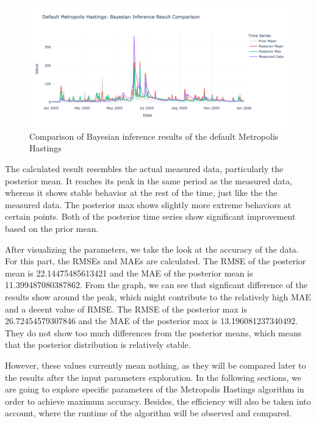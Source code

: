 \begin{figure}
    \centering
    \includegraphics[width=1\textwidth]{figures/basic_mh/default_mh/default_mh_bayes.png}
    \captionsetup{width=.8\textwidth}
    \caption{Comparison of Bayesian inference results of the default Metropolis Hastings}
    \label{fig:enter-label}
\end{figure}

The calculated result resembles the actual measured data, particularly the posterior mean. It reaches its peak in the same period as the measured data, whereas it shows stable behavior at the rest of the time, just like the the measured data. The posterior max shows slightly more extreme behaviors at certain points. Both of the posterior time series show significant improvement based on the prior mean. 

After visualizing the parameters, we take the look at the accuracy of the data. For this part, the RMSEs and MAEs are calculated. The RMSE of the posterior mean is 22.14475485613421 and the MAE of the posterior mean is 11.399487080387862. From the graph, we can see that signficant difference of the results show around the peak, which might contribute to the relatively high MAE and a decent value of RMSE. The RMSE of the posterior max is 26.72454579307846 and the MAE of the posterior max is 13.196081237340492. They do not show too much differences from the posterior means, which means that the posterior distribution is relatively stable. 

However, these values currently mean nothing, as they will be compared later to the results after the input parameters exploration. In the following sections, we are going to explore specific parameters of the Metropolis Hastings algorithm in order to achieve maximum accuracy. Besides, the efficiency will also be taken into account, where the runtime of the algorithm will be observed and compared.



